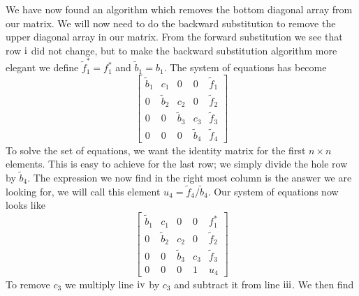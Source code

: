 \documentclass[%
 reprint,
nofootinbib,
 amsmath,amssymb,
 aps,
]{revtex4-1}
\newcommand{\RN}[1]{%
  \textup{\uppercase\expandafter{\romannumeral#1}}%
}
\begin{document}
We have now found an algorithm which removes the bottom diagonal array from our matrix. We will now need to do the backward substitution to remove the upper diagonal array in our matrix. From the forward substitution we see that row $\RN{1}$ did not change, but to make the backward substitution algorithm more elegant we define $ \tilde{f}^*_1=f^{*}_1$ and $\tilde{b}_1 = b_1$. The system of equations has become
\begin{equation}
  \begin{bmatrix}
      \tilde{b}_1 & c_1   & 0   & 0 &   \tilde{f}_1             \\
      0 & \tilde{b}_2 & c_2 & 0 &   \tilde{f}_2  \\
      0   & 0 & \tilde{b}_3 & c_3 & \tilde{f}_3\\
      0   & 0   & 0 & \tilde{b}_4 & \tilde{f}_4
  \end{bmatrix} \label{gaussian_elimination5}
\end{equation}
To solve the set of equations, we want the identity matrix for the first $n\times n$ elements. This is easy to achieve for the last row; we simply divide the hole row by $\tilde{b}_4$. The expression we now find in the right most column is the answer we are looking for, we will call this element $u_4 = \tilde{f}_4/\tilde{b}_4$. Our system of equations now looks like
\begin{equation}
  \begin{bmatrix}
     \tilde{b}_1 & c_1   & 0   & 0 &   f^{*}_1               \\
      0 & \tilde{b}_2 & c_2 & 0 &   \tilde{f}_2  \\
      0   & 0 & \tilde{b}_3 & c_3 & \tilde{f}_3\\
      0   & 0   & 0 & 1 & u_4
  \end{bmatrix} \label{gaussian_elimination11}
\end{equation}
To remove $c_3$ we multiply line $\RN{4}$ by $c_3$ and subtract it from line $\RN{3}$. We then find
\end{document}
